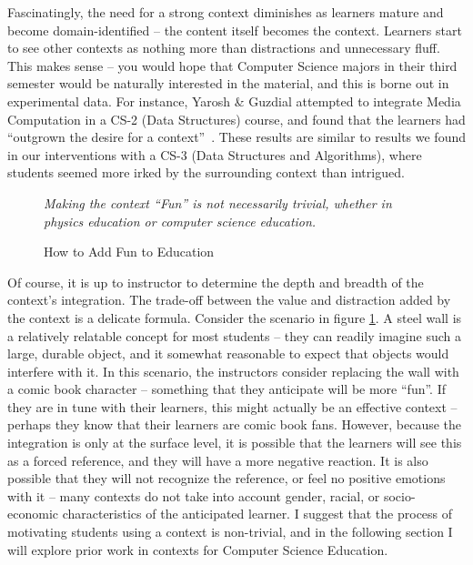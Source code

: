 Fascinatingly, the need for a strong context diminishes as learners mature and become domain-identified -- the content itself becomes the context.
Learners start to see other contexts as nothing more than distractions and unnecessary fluff.
This makes sense -- you would hope that Computer Science majors in their third semester would be naturally interested in the material, and this is borne out in experimental data.
For instance, Yarosh \& Guzdial attempted to integrate Media Computation in a CS-2 (Data Structures) course, and found that the learners had ``outgrown the desire for a context''~\cite{yarosh2008narrating}. 
These results are similar to results we found in our interventions with a CS-3 (Data Structures and Algorithms), where students seemed more irked by the surrounding context than intrigued.


\begin{figure}[!ht]
	\begin{center}
	\end{center}
	\caption{How to Add Fun to Education}
	\textit{Making the context ``Fun'' is not necessarily trivial, whether in physics education or computer science education.~\cite{SMBC}}
	\label{fig-comic-context}
\end{figure}

Of course, it is up to instructor to determine the depth and breadth of the context's integration.
The trade-off between the value and distraction added by the context is a delicate formula.
Consider the scenario in figure \ref{fig-comic-context}.
A steel wall is a relatively relatable concept for most students -- they can readily imagine such a large, durable object, and it somewhat reasonable to expect that objects would interfere with it.
In this scenario, the instructors consider replacing the wall with a comic book character -- something that they anticipate will be more ``fun''.
If they are in tune with their learners, this might actually be an effective context -- perhaps they know that their learners are comic book fans.
However, because the integration is only at the surface level, it is possible that the learners will see this as a forced reference, and they will have a more negative reaction.
It is also possible that they will not recognize the reference, or feel no positive emotions with it -- many contexts do not take into account gender, racial, or socio-economic characteristics of the anticipated learner.
I suggest that the process of motivating students using a context is non-trivial, and in the following section I will explore prior work in contexts for Computer Science Education.